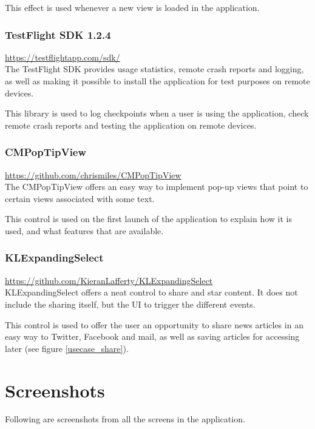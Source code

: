 This effect is used whenever a new view is loaded in the application.


\subsubsection{TestFlight SDK 1.2.4}
\url{https://testflightapp.com/sdk/}\\

The TestFlight SDK provides usage statistics, remote crash reports and logging, as well as making it possible to install the application for test purposes on remote devices.

This library is used to log checkpoints when a user is using the application, check remote crash reports and testing the application on remote devices.


\subsubsection{CMPopTipView}
\url{https://github.com/chrismiles/CMPopTipView}\\

The CMPopTipView offers an easy way to implement pop-up views that point to certain views associated with some text.

This control is used on the first launch of the application to explain how it is used, and what features that are available.


\subsubsection{KLExpandingSelect}
\url{https://github.com/KieranLafferty/KLExpandingSelect}\\

KLExpandingSelect offers a neat control to share and star content. It does not include the sharing itself, but the UI to trigger the different events.

This control is used to offer the user an opportunity to share news articles in an easy way to Twitter, Facebook and mail, as well as saving articles for accessing later (see figure \ref{usecase_share}).


\section{Screenshots}
Following are screenshots from all the screens in the application.

